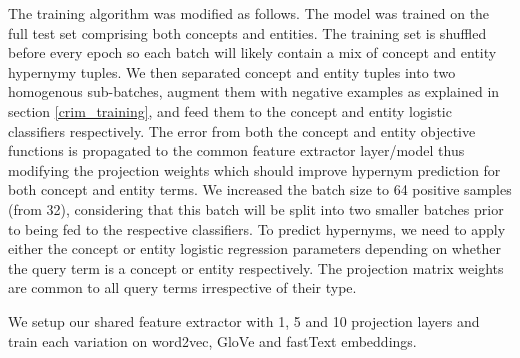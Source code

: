 The training algorithm was modified as follows.  The model was trained on the full test set comprising both concepts and entities.  The training set is shuffled before every epoch so each batch will likely contain a mix of concept and entity hypernymy tuples.  We then separated concept and entity tuples into two homogenous sub-batches, augment them with negative examples as explained in section \ref{crim_training}, and feed them to the concept and entity logistic classifiers respectively.  The error from both the concept and entity objective functions is propagated to the common feature extractor layer/model thus modifying the projection weights which should improve hypernym prediction for both concept and entity terms.  We increased the batch size to 64 positive samples (from 32), considering that this batch will be split into two smaller batches prior to being fed to the respective classifiers.  To predict hypernyms, we need to apply either the concept or entity logistic regression parameters depending on whether the query term is a concept or entity respectively.  The projection matrix weights are common to all query terms irrespective of their type.

We setup our shared feature extractor with 1, 5 and 10 projection layers and train each variation on word2vec, GloVe and fastText embeddings.